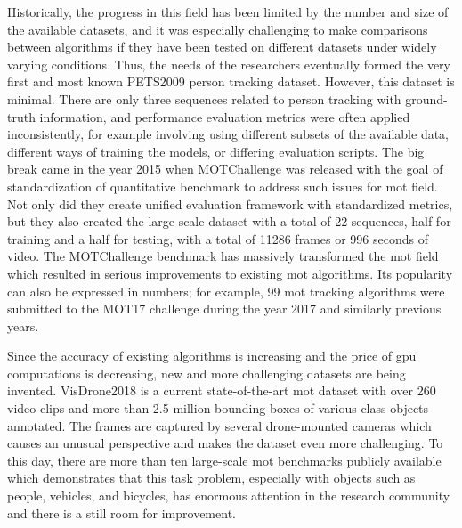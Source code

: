 \begin{introduction}
    Historically, the progress in this field has been limited by the number and size of the available datasets, and it was especially challenging to make comparisons between algorithms if they have been tested on different datasets under widely varying conditions. Thus, the needs of the researchers eventually formed the very first and most known PETS2009 \cite{ferryman2009pets2009} person tracking dataset. However, this dataset is minimal. There are only three sequences related to person tracking with ground-truth information, and performance evaluation metrics were often applied inconsistently, for example involving using different subsets of the available data, different ways of training the models, or differing evaluation scripts. The big break came in the year 2015 when MOTChallenge \cite{MOTChallenge2015} was released with the goal of standardization of quantitative benchmark to address such issues for \gls{mot} field. Not only did they create unified evaluation framework with standardized metrics, but they also created the large-scale dataset with a total of 22 sequences, half for training and a half for testing, with a total of 11286 frames or 996 seconds of video. The MOTChallenge \cite{MOTChallenge2015} benchmark has massively transformed the \gls{mot} field which resulted in serious improvements to existing \gls{mot} algorithms. Its popularity can also be expressed in numbers; for example, 99 \gls{mot} tracking algorithms were submitted to the MOT17 challenge \cite{mot16} during the year 2017 and similarly previous years. 
    
    Since the accuracy of existing algorithms is increasing and the price of \gls{gpu} computations is decreasing, new and more challenging datasets are being invented. VisDrone2018 \cite{zhuvisdrone2018} is a current state-of-the-art \gls{mot} dataset with over 260 video clips and more than 2.5 million bounding boxes of various class objects annotated. The frames are captured by several drone-mounted cameras which causes an unusual perspective and makes the dataset even more challenging. To this day, there are more than ten large-scale \gls{mot} benchmarks publicly available which demonstrates that this task problem, especially with objects such as people, vehicles, and bicycles, has enormous attention in the research community and there is a still room for improvement. 
    

\end{introduction}
